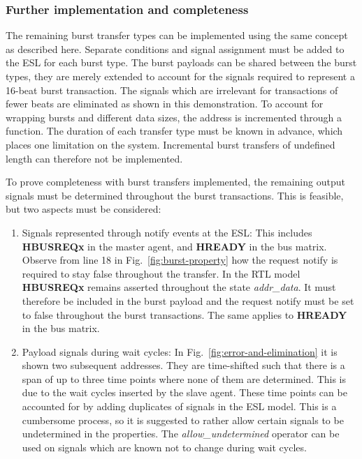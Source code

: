 \subsubsection{Further implementation and completeness}
The remaining burst transfer types can be implemented using the same concept as described here. Separate conditions and signal assignment must be added to the ESL for each burst type. The burst payloads can be shared between the burst types, they are merely extended to account for the signals required to represent a 16-beat burst transaction. The signals which are irrelevant for transactions of fewer beats are eliminated as shown in this demonstration. To account for wrapping bursts and different data sizes, the address is incremented through a function. The duration of each transfer type must be known in advance, which places one limitation on the system. Incremental burst transfers of undefined length can therefore not be implemented. \par
To prove completeness with burst transfers implemented, the remaining output signals must be determined throughout the burst transactions. This is feasible, but two aspects must be considered: 
\begin{enumerate}
 \item Signals represented through notify events at the ESL: This includes \textbf{HBUSREQx} in the master agent, and \textbf{HREADY} in the bus matrix. Observe from line 18 in Fig.~\ref{fig:burst-property} how the request notify is required to stay false throughout the transfer. In the RTL model \textbf{HBUSREQx} remains asserted throughout the state \textit{addr\_data}. It must therefore be included in the burst payload and the request notify must be set to false throughout the burst transactions. The same applies to \textbf{HREADY} in the bus matrix.
 \item Payload signals during wait cycles: In Fig.~\ref{fig:error-and-elimination} it is shown two subsequent addresses. They are time-shifted such that there is a span of up to three time points where none of them are determined. This is due to the wait cycles inserted by the slave agent. These time points can be accounted for by adding duplicates of signals in the ESL model. This is a cumbersome process, so it is suggested to rather allow certain signals to be undetermined in the properties. The \textit{allow\_undetermined} operator can be used on signals which are known not to change during wait cycles. 
\end{enumerate}

